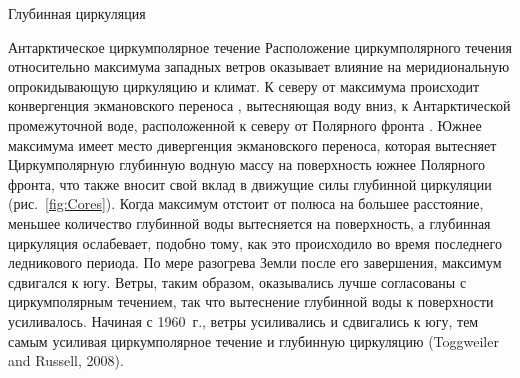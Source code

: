 \begin{chapter}{Глубинная циркуляция}
\begin{section}{Антарктическое циркумполярное течение}
Расположение циркумполярного течения относительно максимума западных ветров
оказывает влияние на меридиональную опрокидывающую циркуляцию и климат.
К северу от максимума происходит конвергенция экмановского переноса%
, вытесняющая воду вниз, к Антарктической
промежуточной воде, расположенной к северу от Полярного фронта%
. Южнее максимума имеет место дивергенция
экмановского переноса, которая вытесняет Циркумполярную глубинную водную массу
на поверхность южнее Полярного фронта, что также вносит свой вклад в 
движущие силы глубинной циркуляции (рис.~\ref{fig:Cores}). Когда максимум отстоит
от полюса на большее расстояние, меньшее количество глубинной воды вытесняется
на поверхность, а глубинная циркуляция ослабевает, подобно тому, как это
происходило во время последнего ледникового периода. По мере разогрева Земли
после его завершения, максимум сдвигался к югу. Ветры, таким образом, 
оказывались лучше согласованы с циркумполярным течением, так что вытеснение
глубинной воды к поверхности усиливалось. Начиная с 1960~г., ветры усиливались
и сдвигались к югу, тем самым усиливая циркумполярное течение и глубинную
циркуляцию (Toggweiler and Russell, 2008).
%


\end{section}
\end{chapter}
